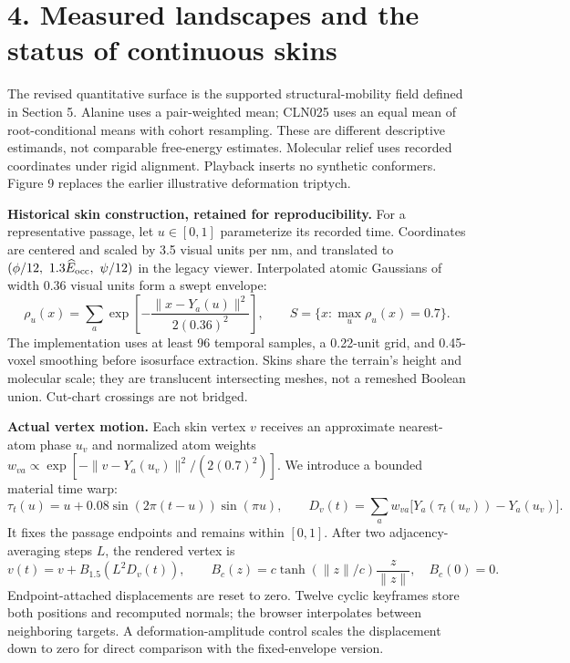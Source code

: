 \documentclass[11pt]{article}
\begin{document}
\newpage

\newpage
\section*{4. Measured landscapes and the status of continuous skins}
The revised quantitative surface is the supported structural-mobility field
defined in Section 5. Alanine uses a pair-weighted mean; CLN025 uses an equal
mean of root-conditional means with cohort resampling. These are different
descriptive estimands, not comparable free-energy estimates. Molecular relief
uses recorded coordinates under rigid alignment. Playback inserts no synthetic
conformers. Figure 9 replaces the earlier illustrative deformation triptych.

\textbf{Historical skin construction, retained for reproducibility.}
For a representative passage, let $u\in[0,1]$ parameterize its recorded time.
Coordinates are centered and scaled by 3.5 visual units per nm, and translated
to $(\phi/12,\ 1.3\widehat E_{\rm occ},\ \psi/12)$ in the legacy viewer.
Interpolated atomic Gaussians of width 0.36 visual units form a swept envelope:
\[
 \rho_u(x)=\sum_a \exp\!\left[-\frac{\|x-Y_a(u)\|^2}{2(0.36)^2}\right],
 \qquad S=\{x:\max_u\rho_u(x)=0.7\}.
\]
The implementation uses at least 96 temporal samples, a 0.22-unit grid, and
0.45-voxel smoothing before isosurface extraction. Skins share the terrain's
height and molecular scale; they are translucent intersecting meshes, not
a remeshed Boolean union. Cut-chart crossings are not bridged.

\textbf{Actual vertex motion.}
Each skin vertex $v$ receives an approximate nearest-atom phase $u_v$ and
normalized atom weights $w_{va}\propto
\exp[-\|v-Y_a(u_v)\|^2/(2(0.7)^2)]$.
We introduce a bounded material time warp:
\[
 \tau_t(u)=u+0.08\sin(2\pi(t-u))\sin(\pi u),\qquad
 D_v(t)=\sum_a w_{va}\big[Y_a(\tau_t(u_v))-Y_a(u_v)\big].
\]
It fixes the passage endpoints and remains within $[0,1]$.
After two adjacency-averaging steps $L$, the rendered vertex is
\[
 v(t)=v+B_{1.5}\!\left(L^2D_v(t)\right),\qquad
 B_c(z)=c\tanh(\|z\|/c)\frac{z}{\|z\|},\quad B_c(0)=0.
\]
Endpoint-attached displacements are reset to zero. Twelve cyclic keyframes
store both positions and recomputed normals; the browser interpolates between
neighboring targets. A deformation-amplitude control scales the displacement
down to zero for direct comparison with the fixed-envelope version.
\end{document}
